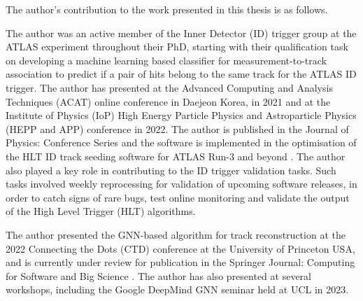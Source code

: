 The author’s contribution to the work presented in this thesis is as follows.

The author was an active member of the Inner Detector (ID) trigger group at the ATLAS experiment throughout their PhD, starting with their qualification task on developing a machine learning based classifier for measurement-to-track association to predict if a pair of hits belong to the same track for the ATLAS ID trigger. The author has presented at the Advanced Computing and Analysis Techniques (ACAT) online conference in Daejeon Korea, in 2021 and at the Institute of Physics (IoP) High Energy Particle Physics and Astroparticle Physics (HEPP and APP) conference in 2022. The author is published in the Journal of Physics: Conference Series \cite{Lad_2023} and the software is implemented in the optimisation of the HLT ID track seeding software for ATLAS Run-3 and beyond \cite{Grandi:2728111, Long:2813981}. The author also played a key role in contributing to the ID trigger validation tasks. Such tasks involved weekly reprocessing for validation of upcoming software releases, in order to catch signs of rare bugs, test online monitoring and validate the output of the High Level Trigger (HLT) algorithms.

The author presented the GNN-based algorithm for track reconstruction at the 2022 Connecting the Dots (CTD) conference at the University of Princeton USA, and is currently under review for publication in the Springer Journal: Computing for Software and Big Science \cite{Lad_2023_gnn}. The author has also presented at several workshops, including the Google DeepMind GNN seminar held at UCL in 2023.

